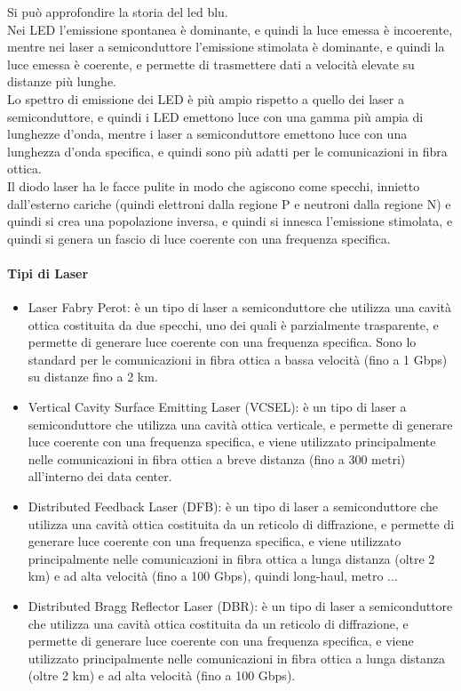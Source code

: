 Si può approfondire la storia del led blu.\\

Nei LED l'emissione spontanea è dominante, e quindi la luce emessa è incoerente, mentre nei laser a semiconduttore l'emissione stimolata è dominante, 
e quindi la luce emessa è coerente, e permette di trasmettere dati a velocità elevate su distanze più lunghe.\\
Lo spettro di emissione dei LED è più ampio rispetto a quello dei laser a semiconduttore, e quindi i LED emettono luce con una gamma più ampia di lunghezze d'onda,
mentre i laser a semiconduttore emettono luce con una lunghezza d'onda specifica, e quindi sono più adatti per le comunicazioni in fibra ottica.\\

Il diodo laser ha le facce pulite in modo che agiscono come specchi, innietto dall'esterno cariche (quindi elettroni dalla regione P e neutroni dalla regione N) e quindi si crea una popolazione inversa, 
e quindi si innesca l'emissione stimolata, e quindi si genera un fascio di luce coerente con una frequenza specifica.\\

\paragraph{Tipi di Laser}
\begin{itemize}
    \item Laser Fabry Perot: è un tipo di laser a semiconduttore che utilizza una cavità ottica costituita da due specchi, uno dei quali è parzialmente trasparente, 
    e permette di generare luce coerente con una frequenza specifica. Sono lo standard per le comunicazioni in fibra ottica a bassa velocità (fino a 1 Gbps) su distanze fino a 2 km.\\
    \item Vertical Cavity Surface Emitting Laser (VCSEL): è un tipo di laser a semiconduttore che utilizza una cavità ottica verticale, e permette di generare luce coerente con una frequenza 
    specifica, e viene utilizzato principalmente nelle comunicazioni in fibra ottica a breve distanza (fino a 300 metri) all'interno dei data center.\\
    \item Distributed Feedback Laser (DFB): è un tipo di laser a semiconduttore che utilizza una cavità ottica costituita da un reticolo di diffrazione, e permette di generare luce coerente con una frequenza specifica,
    e viene utilizzato principalmente nelle comunicazioni in fibra ottica a lunga distanza (oltre 2 km) e ad alta velocità (fino a 100 Gbps), quindi long-haul, metro ...\\
    \item Distributed Bragg Reflector Laser (DBR): è un tipo di laser a semiconduttore che utilizza una cavità ottica costituita da un reticolo di diffrazione, e permette di generare luce coerente con una frequenza specifica,
    e viene utilizzato principalmente nelle comunicazioni in fibra ottica a lunga distanza (oltre 2 km) e ad alta velocità (fino a 100 Gbps).\\
\end{itemize}

